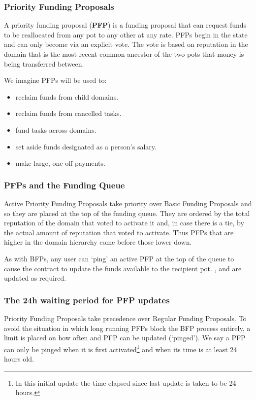 \subsubsection{Priority Funding Proposals}
A priority funding proposal (\textbf{PFP}) is a funding proposal that can request funds to be reallocated from any pot to any other at any rate. PFPs begin in the  state and can only become  via an explicit vote. The vote is based on reputation in the domain that is the most recent common ancestor of the two pots that money is being transferred between.

We imagine PFPs will be used to:
\begin{itemize}
 \item reclaim funds from child domains.
 \item reclaim funds from cancelled tasks.
 \item fund tasks across domains.
 \item set aside funds designated as a person's salary.
 \item make large, one-off payments.
 \end{itemize}


\subsubsection*{PFPs and the Funding Queue}

Active Priority Funding Proposals take priority over Basic Funding Proposals and so they are placed at the top of the funding queue. They are ordered by the total reputation of the domain that voted to activate it and, in case there is a tie, by the actual amount of reputation that voted to activate. Thus PFPs that are higher in the domain hierarchy come before those lower down.

As with BFPs, any user can `ping' an active PFP at the top of the queue to cause the contract to update the funds available to the recipient pot. ,  and  are updated as required.

\subsubsection*{The 24h waiting period for PFP updates}
Priority Funding Proposals take precedence over Regular Funding Proposals. To avoid the situation in which long running PFPs block the BFP process entirely, a limit is placed on how often and PFP can be updated (`pinged'). We say a PFP can only be pinged when it is first activated\footnote{In this initial update the time elapsed since last update is taken to be 24 hours.} and when its  time is at least 24 hours old.

